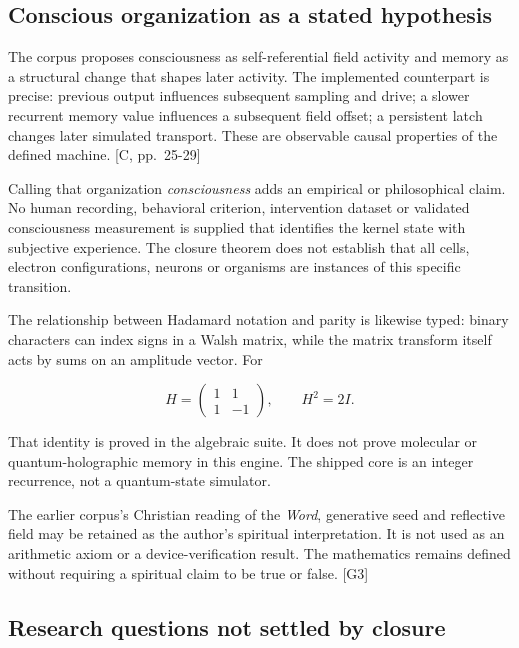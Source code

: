 \documentclass[11pt,a4paper]{article}
\begin{document}
\subsection{Conscious organization as a stated
hypothesis}\label{conscious-organization-as-a-stated-hypothesis}

The corpus proposes consciousness as self-referential field activity and
memory as a structural change that shapes later activity. The
implemented counterpart is precise: previous output influences
subsequent sampling and drive; a slower recurrent memory value
influences a subsequent field offset; a persistent latch changes later
simulated transport. These are observable causal properties of the
defined machine. {[}C, pp.~25-29{]}

Calling that organization \emph{consciousness} adds an empirical or
philosophical claim. No human recording, behavioral criterion,
intervention dataset or validated consciousness measurement is supplied
that identifies the kernel state with subjective experience. The closure
theorem does not establish that all cells, electron configurations,
neurons or organisms are instances of this specific transition.

The relationship between Hadamard notation and parity is likewise typed:
binary characters can index signs in a Walsh matrix, while the matrix
transform itself acts by sums on an amplitude vector. For

\[
H=\begin{pmatrix}1&1\\1&-1\end{pmatrix},\qquad H^2=2I.
\]

That identity is proved in the algebraic suite. It does not prove
molecular or quantum-holographic memory in this engine. The shipped core
is an integer recurrence, not a quantum-state simulator.

The earlier corpus's Christian reading of the \emph{Word}, generative
seed and reflective field may be retained as the author's spiritual
interpretation. It is not used as an arithmetic axiom or a
device-verification result. The mathematics remains defined without
requiring a spiritual claim to be true or false. {[}G3{]}

\subsection{Research questions not settled by
closure}\label{research-questions-not-settled-by-closure}
\end{document}
